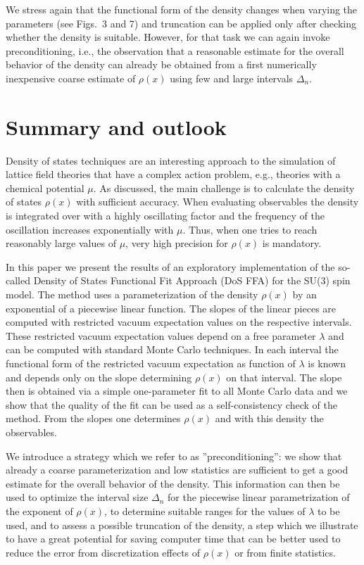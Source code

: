 \documentclass[a4paper,11pt]{article}
\begin{document}
We stress again that the functional form of the density changes when varying the parameters (see Figs.~3 and 7)
and truncation can be applied only after checking whether the density is suitable. However, for that task 
we can again invoke 
preconditioning, i.e., the observation that a reasonable estimate for the overall behavior of the density can already be 
obtained from a first numerically inexpensive coarse estimate of $\rho(x)$ using few and large intervals $\Delta_n$.

 
\section{Summary and outlook}

Density of states techniques are an interesting approach to the simulation of lattice field theories that have a complex
action problem, e.g., theories with a chemical potential $\mu$. As discussed, the main challenge is to 
calculate the density of states $\rho(x)$ with sufficient accuracy. When evaluating observables the density is 
integrated over with a highly oscillating factor and the frequency of the oscillation increases exponentially with $\mu$. 
Thus, when one tries to reach reasonably large values of $\mu$, very high precision for $\rho(x)$ is mandatory.

In this paper we present the results of an exploratory implementation of the so-called Density of States Functional Fit 
Approach (DoS FFA) for the SU(3) spin model. The method uses a parameterization of the density $\rho(x)$ by 
an exponential of a piecewise linear function. The slopes of the linear pieces are computed with restricted vacuum
expectation values on the respective intervals. These restricted vacuum expectation values depend on a free parameter 
$\lambda$ and can be computed with standard Monte Carlo techniques. In each interval the functional form 
of the restricted vacuum expectation as function of $\lambda$ is known and depends only on the slope determining 
$\rho(x)$ on that interval. The slope then is obtained via a simple one-parameter fit to all Monte Carlo data and we 
show that the quality of the fit can be used as a self-consistency check of the method. 
From the slopes one determines $\rho(x)$ and with this density the observables.

We introduce a strategy which we refer to as ''preconditioning'': we show that already a coarse parameterization 
and low statistics are sufficient to get a good estimate for the overall behavior of the density. This information can then 
be used to optimize the interval size $\Delta_n$ 
for the piecewise linear parametrization of the exponent of $\rho(x)$, to determine
suitable ranges for the values of $\lambda$ to be used, and to assess a possible truncation of the density, a step which 
we illustrate to have a great potential for saving computer time that can be better used to reduce the error from 
discretization effects of $\rho(x)$ or from finite statistics.
\end{document}
